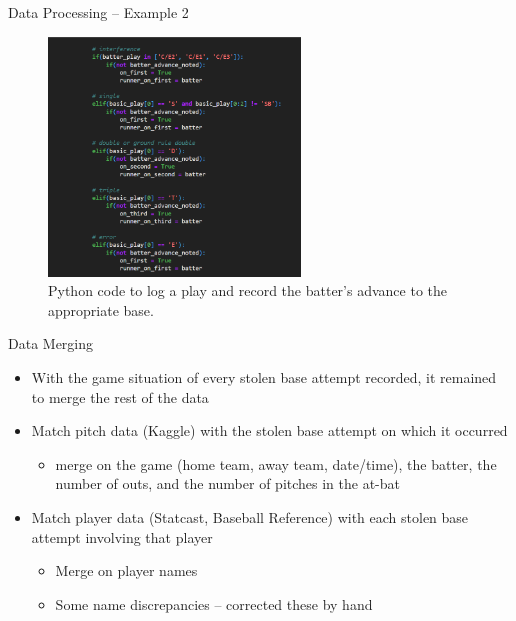 \documentclass[10pt]{beamer}
\begin{document}
\begin{frame}{Data Processing -- Example 2}
\begin{figure}
    \includegraphics[height=2.5in]{images/code_example_2.png}
    \caption{Python code to log a play and record the batter's advance to the appropriate base.}
    \label{code_example_2}
\end{figure}
\end{frame}

\begin{frame}{Data Merging}
\begin{itemize}
    \item With the game situation of every stolen base attempt recorded, it remained to merge the rest of the data
    \vspace{3mm}
    \item Match pitch data (Kaggle) with the stolen base attempt on which it occurred
    \begin{itemize}
        \item merge on the game (home team, away team, date/time), the batter, the number of outs, and the number of pitches in the at-bat 
    \end{itemize}
    \vspace{3mm}
    \item Match player data (Statcast, Baseball Reference) with each stolen base attempt involving that player
    \begin{itemize}
        \item Merge on player names
        
        \item Some name discrepancies -- corrected these by hand
    \end{itemize}
\end{itemize}
\end{frame}
\end{document}
